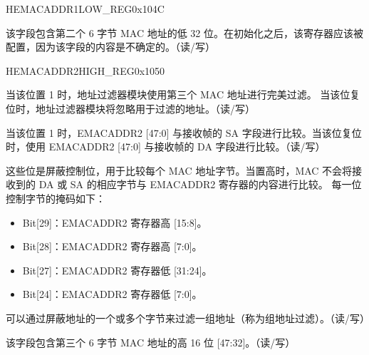 \begin{register}{H}{EMACADDR1LOW\_REG}{0x104C}\label{regdesc:EMACADDR1LOWREG}
%
\regnewline%
\begin{regdesc}\begin{reglist}
\item [EMACADDR1LOW\_REG]该字段包含第二个 6 字节 MAC 地址的低 32 位。在初始化之后，该寄存器应该被配置，因为该字段的内容是不确定的。（读/写）
\end{reglist}\end{regdesc}
\end{register}


\begin{register}{H}{EMACADDR2HIGH\_REG}{0x1050}\label{regdesc:EMACADDR2HIGHREG}
%
%
%
%
%
\regnewline%
\begin{regdesc}\begin{reglist}
\item [ADDRESS\_ENABLE2]当该位置 1 时，地址过滤器模块使用第三个 MAC 地址进行完美过滤。 当该位复位时，地址过滤器模块将忽略用于过滤的地址。（读/写）
\item [SOURCE\_ADDRESS2]当该位置 1 时，EMACADDR2 [47:0] 与接收帧的 SA 字段进行比较。当该位复位时，使用 EMACADDR2 [47:0] 与接收帧的 DA 字段进行比较。（读/写）
\item [MASK\_BYTE\_CONTROL2] 这些位是屏蔽控制位，用于比较每个 MAC 地址字节。当置高时，MAC 不会将接收到的 DA 或 SA 的相应字节与 EMACADDR2 寄存器的内容进行比较。 每一位控制字节的掩码如下：
\begin{itemize}
\item Bit[29]：EMACADDR2 寄存器高 [15:8]。\item Bit[28]：EMACADDR2 寄存器高 [7:0]。\item Bit[27]：EMACADDR2 寄存器低 [31:24]。\item Bit[24]：EMACADDR2 寄存器低 [7:0]。\end{itemize}
可以通过屏蔽地址的一个或多个字节来过滤一组地址（称为组地址过滤）。（读/写）
\item [MAC\_ADDRESS2\_HI] 该字段包含第三个 6 字节 MAC 地址的高 16 位 [47:32]。（读/写）
\end{reglist}\end{regdesc}
\end{register}


